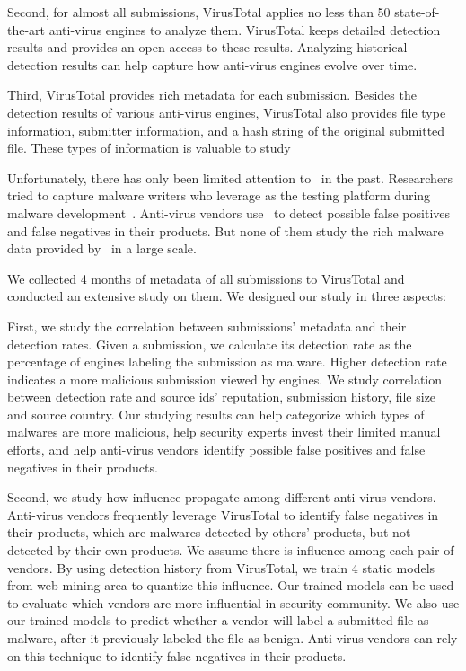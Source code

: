 Second, for almost all submissions, 
VirusTotal applies no less than 50 state-of-the-art anti-virus engines to analyze them. 
VirusTotal keeps detailed detection results and provides an open access to these results. 
Analyzing historical detection results can help capture how anti-virus engines evolve over time. 

Third, VirusTotal provides rich metadata for each submission. 
Besides the detection results of various anti-virus engines, 
VirusTotal also provides file type information, submitter information, and a hash string of the original submitted file.
These types of information is valuable to study 

Unfortunately, there has only been limited attention to \vt\ in the past. 
Researchers tried to capture malware writers who leverage \vt{} as the testing platform during malware development~\cite{huangvt2016bigdata, neeles}. 
Anti-virus vendors use \vt\ to detect possible false positives and false negatives in their products. 
But none of them study the rich malware data provided by \vt\ in a large scale. 

We collected 4 months of metadata of all submissions to VirusTotal 
and conducted an extensive study on them.
We designed our study in three aspects: 

First, we study the correlation between submissions’ metadata and their detection rates. 
Given a submission, 
we calculate its detection rate as the percentage of engines 
labeling the submission as malware. 
Higher detection rate indicates a more malicious submission viewed by engines.  
We study correlation between detection rate 
and source ids’ reputation, submission history, file size and source country. 
Our studying results can help categorize which types of malwares are more malicious, 
help security experts invest their limited manual efforts, 
and help anti-virus vendors identify possible false positives and false negatives in their products.   


Second, we study how influence propagate among different anti-virus vendors. 
Anti-virus vendors frequently leverage VirusTotal to identify false negatives in their products, 
which are malwares detected by others’ products, 
but not detected by their own products. 
We assume there is influence among each pair of vendors. 
By using detection history from VirusTotal, 
we train 4 static models from web mining area to quantize this influence. 
Our trained models can be used to evaluate which vendors are more influential in security community. 
We also use our trained models to predict whether a vendor will label a submitted file as malware, 
after it previously labeled the file as benign. 
Anti-virus vendors can rely on this technique to identify false negatives in their products. 

